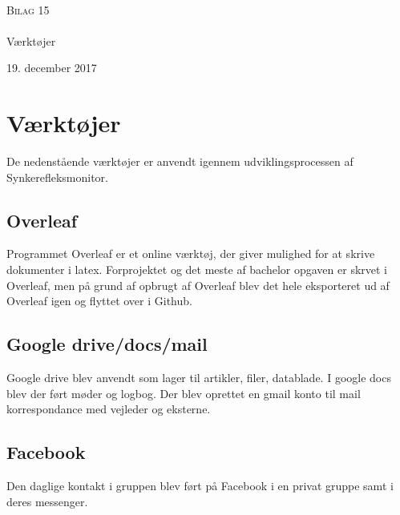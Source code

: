 

\begin{titlingpage}
\begin{center}

~ \\[3cm]

\textsc{\LARGE Bilag 15}\\[1.5cm]


\noindent\makebox[\linewidth]{\rule{\textwidth}{0.4pt}}\\
[0.5cm]{\Huge Værktøjer}
\noindent\makebox[\linewidth]{\rule{\textwidth}{0.4pt}}
\end{center}
\vfill
\begin{center}
{\large 19. december 2017}
\end{center}
\end{titlingpage}

\newpage
\tableofcontents*
\newpage

\chapter{Værktøjer}
De nedenstående værktøjer er anvendt igennem udviklingsprocessen af Synkerefleksmonitor. 

\section{Overleaf} 
Programmet Overleaf er et online værktøj, der giver mulighed for at skrive dokumenter i latex. Forprojektet og det meste af bachelor opgaven er skrvet i Overleaf, men på grund af opbrugt af Overleaf blev det hele eksporteret ud af Overleaf igen og flyttet over i Github.

\section{Google drive/docs/mail}
Google drive blev anvendt som lager til artikler, filer, datablade.
I google docs blev der ført møder og logbog. Der blev oprettet en gmail konto til mail korrespondance med vejleder og eksterne.

\section{Facebook}
Den daglige kontakt i gruppen blev ført på Facebook i en privat gruppe samt i deres messenger.

